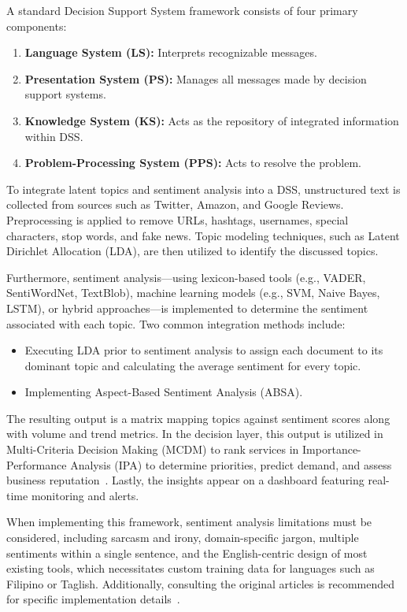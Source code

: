 \documentclass[12pt,a4paper]{report}
\begin{document}
A standard Decision Support System framework consists of four primary components:
\begin{enumerate}
	\item \textbf{Language System (LS):} Interprets recognizable messages.
	\item \textbf{Presentation System (PS):} Manages all messages made by decision support systems.
	\item \textbf{Knowledge System (KS):} Acts as the repository of integrated information within DSS.
	\item \textbf{Problem-Processing System (PPS):} Acts to resolve the problem.
\end{enumerate}

To integrate latent topics and sentiment analysis into a DSS, unstructured text is collected from sources such as Twitter, Amazon, and Google Reviews. Preprocessing is applied to remove URLs, hashtags, usernames, special characters, stop words, and fake news. Topic modeling techniques, such as Latent Dirichlet Allocation (LDA), are then utilized to identify the discussed topics.

Furthermore, sentiment analysis—using lexicon-based tools (e.g., VADER, SentiWordNet, TextBlob), machine learning models (e.g., SVM, Naive Bayes, LSTM), or hybrid approaches—is implemented to determine the sentiment associated with each topic. Two common integration methods include:
\begin{itemize}
	\item Executing LDA prior to sentiment analysis to assign each document to its dominant topic and calculating the average sentiment for every topic.
	\item Implementing Aspect-Based Sentiment Analysis (ABSA).
\end{itemize}

The resulting output is a matrix mapping topics against sentiment scores along with volume and trend metrics. In the decision layer, this output is utilized in Multi-Criteria Decision Making (MCDM) to rank services in Importance-Performance Analysis (IPA) to determine priorities, predict demand, and assess business reputation~\parencite{AguilarMoreno2024}. Lastly, the insights appear on a dashboard featuring real-time monitoring and alerts.

When implementing this framework, sentiment analysis limitations must be considered, including sarcasm and irony, domain-specific jargon, multiple sentiments within a single sentence, and the English-centric design of most existing tools, which necessitates custom training data for languages such as Filipino or Taglish. Additionally, consulting the original articles is recommended for specific implementation details~\parencite{AguilarMoreno2024}.
\end{document}
